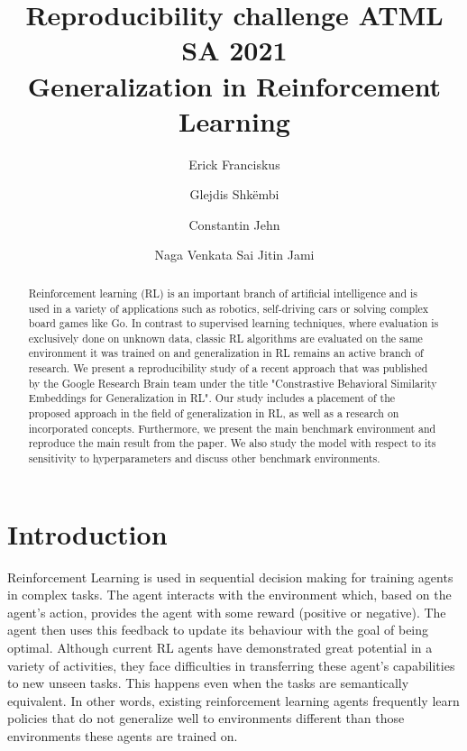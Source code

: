 \documentclass{usiinftr}
\begin{document}
\title{\bf Reproducibility challenge ATML SA 2021 \\ {\normalfont Generalization in Reinforcement Learning}}
\author{Erick Franciskus}{\ddagger}
\author{Glejdis Shk\"embi}{\ddagger}
\author{Constantin Jehn}{\ddagger}
\author{Naga Venkata Sai Jitin Jami}{\ddagger}




%
%

\maketitle
\begin{abstract}
Reinforcement learning (RL) is an important branch of artificial intelligence and is used in a variety of applications such as robotics, self-driving cars or solving complex board games like Go.
In contrast to supervised learning techniques, where evaluation is exclusively done on unknown data, classic RL algorithms are evaluated on the same environment it was trained on and generalization in RL remains an active branch of research.
We present a reproducibility study of a recent approach that was published by the Google Research Brain team under the title "Constrastive Behavioral Similarity Embeddings for Generalization in RL".
Our study includes a placement of the proposed approach in the field of generalization in RL, as well as a research on incorporated concepts.
Furthermore, we present the main benchmark environment and reproduce the main result from the paper.
We also study the model with respect to its sensitivity to hyperparameters and discuss other benchmark environments.


\end{abstract}

\section{Introduction}
Reinforcement Learning is used in sequential decision making for training agents in complex tasks. The agent interacts with the environment which, based on the agent's action, provides the agent with some reward (positive or negative). The agent then uses this feedback to update its behaviour with the goal of being optimal. Although current RL agents have demonstrated great potential in a variety of activities, they face difficulties in transferring these agent's capabilities to new unseen tasks. This happens even when the tasks are semantically equivalent. In other words, existing reinforcement learning agents frequently learn policies that do not generalize well to environments different than those environments these agents are trained on.
\end{document}
